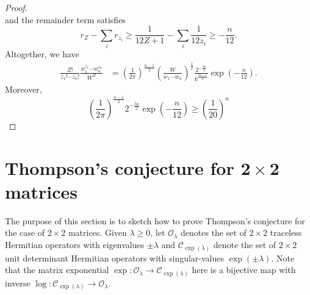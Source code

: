\documentclass[notitlepage, 10pt]{article}
\begin{document}
\begin{proof}
\begin{equation}
    \end{equation}
    and the remainder term satisfies
    \begin{equation}
        r_{Z} - \sum_{i} r_{z_i} \geq \frac{1}{12Z + 1} - \sum_{i}\frac{1}{12z_i} \geq - \frac{n}{12}.
    \end{equation}
    Altogether, we have
    \begin{align}
        \frac{Z!}{z_1! \cdots z_n!}\frac{w_1^{z_{1}}\cdots w_{n}^{z_{n}}}{W^{Z}}
        &=\left(\frac{1}{2\pi}\right)^{\frac{n-1}{2}}\left(\frac{W}{w_1\cdots w_n}\right)^{\frac{1}{2}} \frac{2^{-\frac{5n}{2}}}{k^{\frac{3n-1}{2}}} \exp\left(-\frac{n}{12}\right).
    \end{align}
    Moreover,
    \begin{equation}
        \left(\frac{1}{2\pi}\right)^{\frac{n-1}{2}}2^{-\frac{5n}{2}} \exp\left(-\frac{n}{12}\right) \geq \left(\frac{1}{20}\right)^{n}
    \end{equation}
\end{proof}

\clearpage


\section{Thompson's conjecture for \texorpdfstring{$\boldsymbol{2\times 2}$}{2 by 2} matrices}
\label{sec:2by2case_intuitively}

The purpose of this section is to sketch how to prove Thompson's conjecture for the case of $2\times 2$ matrices.
Given $\lambda \geq 0$, let $\mathcal O_{\lambda}$ denotes the set of $2\times 2$ traceless Hermitian operators with eigenvalues $\pm \lambda$ and $\mathcal C_{\exp(\lambda)}$ denote the set of $2\times 2$ unit determinant Hermitian operators with singular-values $\exp(\pm \lambda)$.
Note that the matrix exponential $\exp : \mathcal O_{\lambda} \to \mathcal C_{\exp(\lambda)}$ here is a bijective map with inverse $\log : \mathcal C_{\exp(\lambda)} \to \mathcal O_{\lambda}$.
\end{document}
